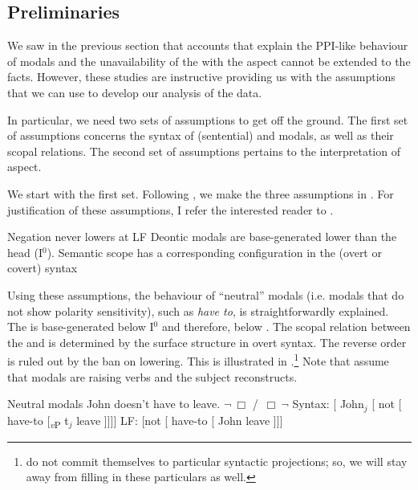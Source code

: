 \documentclass[output=paper,newtxmath,colorlinks,citecolor=brown]{langsci/langscibook}
\begin{document}
\subsection{Preliminaries}\label{subsect:prelim}
We saw in the previous section that accounts that explain the PPI-like behaviour of  modals and the unavailability of the  with the  aspect cannot be extended to the  facts. However, these studies are instructive providing us with the assumptions that we can use to develop our analysis of the  data.

In particular, we  need two sets of assumptions to get off the ground. The first set of assumptions concerns the syntax of (sentential)  and  modals, as well as their scopal relations. The second set of assumptions pertains to the interpretation of  aspect.

We start with the first set. Following \cite{iatzei10,iatzei13}, we make the three assumptions in . For justification of these assumptions, I refer the interested reader to \cite{iatzei10,iatzei13}.

	\ea \label{assume} \ea Negation never lowers at LF
        \ex Deontic modals are base-generated lower than the  head (I$^0$).
        \ex Semantic scope has a corresponding configuration in the (overt or covert) syntax
        \z \z

\noindent Using these assumptions, the behaviour of ``neutral''  modals (i.e. modals that do not show polarity sensitivity), such as  \textit{have to}, is straightforwardly explained. The  is base-generated below I$^0$ and therefore,  below . The scopal relation between the  and  is determined by the surface structure in  overt syntax. The reverse order is ruled out by the ban on  lowering. This is illustrated in .\footnote{\cite{iatzei10,iatzei13} do not commit themselves to particular syntactic projections; so, we will stay away from filling in these particulars as well.
}
Note that \cite{iatzei13} assume that modals are raising verbs and the subject reconstructs.

\ea	Neutral  modals \label{neut}
    \ea John doesn't have to leave. \hfill {} $\neg \ \Box$ /  $\,\Box\ \neg$
	\ex Syntax: [ John$_j$ [ not [ have-to  [\textsubscript{\textit{v}P} t$_j$ leave ]]]]
	\ex LF: [not [ have-to [ John leave ]]]
   \z \z
\end{document}
